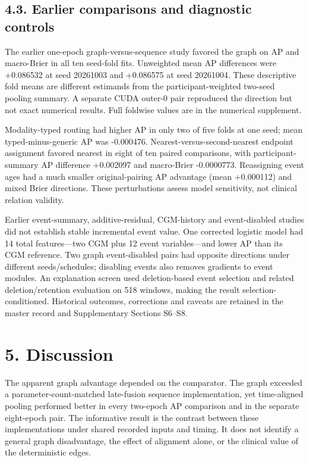 \documentclass[11pt,a4paper]{article}
\begin{document}
\subsection*{4.3. Earlier comparisons and diagnostic controls}
The earlier one-epoch graph-versus-sequence study favored the graph on AP and macro-Brier in all ten seed-fold fits. Unweighted mean AP differences were +0.086532 at seed 20261003 and +0.086575 at seed 20261004. These descriptive fold means are different estimands from the participant-weighted two-seed pooling summary. A separate CUDA outer-0 pair reproduced the direction but not exact numerical results. Full foldwise values are in the numerical supplement.

Modality-typed routing had higher AP in only two of five folds at one seed; mean typed-minus-generic AP was -0.000476. Nearest-versus-second-nearest endpoint assignment favored nearest in eight of ten paired comparisons, with participant-summary AP difference +0.002097 and macro-Brier -0.0000773. Reassigning event ages had a much smaller original-pairing AP advantage (mean +0.000112) and mixed Brier directions. These perturbations assess model sensitivity, not clinical relation validity.

Earlier event-summary, additive-residual, CGM-history and event-disabled studies did not establish stable incremental event value. One corrected logistic model had 14 total features---two CGM plus 12 event variables---and lower AP than its CGM reference. Two graph event-disabled pairs had opposite directions under different seeds/schedules; disabling events also removes gradients to event modules. An explanation screen used deletion-based event selection and related deletion/retention evaluation on 518 windows, making the result selection-conditioned. Historical outcomes, corrections and caveats are retained in the master record and Supplementary Sections S6--S8.

\section*{5. Discussion}
The apparent graph advantage depended on the comparator. The graph exceeded a parameter-count-matched late-fusion sequence implementation, yet time-aligned pooling performed better in every two-epoch AP comparison and in the separate eight-epoch pair. The informative result is the contrast between these implementations under shared recorded inputs and timing. It does not identify a general graph disadvantage, the effect of alignment alone, or the clinical value of the deterministic edges.
\end{document}
